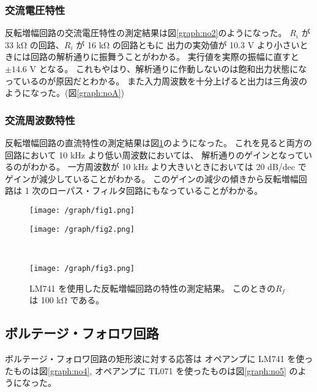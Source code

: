 \documentclass[11pt,dvipdfmx,a4paper]{jsarticle}
\begin{document}
\subsubsection{交流電圧特性}
反転増幅回路の交流電圧特性の測定結果は図\ref{graph:no2}のようになった。
\(R_i\) が 33 k\si{\ohm} の回路、\(R_i\) が 16 k\si{\ohm} の回路ともに
出力の実効値が 10.3 V より小さいときには回路の解析通りに振舞うことがわかる。
実行値を実際の振幅に直すと\(\pm 14.6\) V となる。
これもやはり、解析通りに作動しないのは飽和出力状態になっているのが原因だとわかる。
また入力周波数を十分上げると出力は三角波のようになった。(図\ref{graph:noA})

\subsubsection{交流周波数特性}
反転増幅回路の直流特性の測定結果は図\ref{graph:no3}のようになった。
これを見ると両方の回路において 10 kHz より低い周波数においては、
解析通りのゲインとなっているのがわかる。
一方周波数が 10 kHz より大きいときにおいては 20 dB/dec でゲインが減少していることがわかる。
このゲインの減少の傾きから反転増幅回路は 1 次のローパス・フィルタ回路にもなっていることがわかる。

\begin{figure}[H]
	\centering
	\begin{minipage}[t]{0.49\columnwidth}
		\centering
		\texttt{[image: /graph/fig1.png]}
		\label{graph:no1}
	\end{minipage}
	\hfill
	\begin{minipage}[t]{0.49\columnwidth}
		\centering
		\texttt{[image: /graph/fig2.png]}
		\label{graph:no2}
	\end{minipage}\\
	\begin{minipage}[t]{0.49\columnwidth}
		\centering
		\texttt{[image: /graph/fig3.png]}
		\label{graph:no3}
	\end{minipage}
	\hfill
	\begin{minipage}[t]{0.49\columnwidth}
		\centering
		\label{graph:no3}
	\end{minipage}
	\caption{LM741 を使用した反転増幅回路の特性の測定結果。
	このときの\(R_f\) は 100 k\si{\ohm} である。}
\end{figure}
\subsection{ボルテージ・フォロワ回路}
ボルテージ・フォロワ回路の矩形波に対する応答は
オペアンプに LM741 を使ったものは図\ref{graph:no4},
オペアンプに TL071 を使ったものは図\ref{graph:no5} のようになった。
\end{document}
